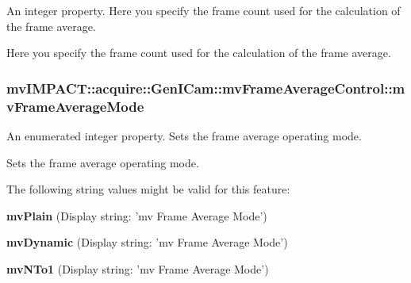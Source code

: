 An integer property. Here you specify the frame count used for the calculation of the frame average. 

Here you specify the frame count used for the calculation of the frame average. \hypertarget{classmv_i_m_p_a_c_t_1_1acquire_1_1_gen_i_cam_1_1mv_frame_average_control_acb77674635dac0f573c9b900d449dd8c}{
\subsubsection[{mv\+Frame\+Average\+Mode}]{ mv\+I\+M\+P\+A\+C\+T\+::acquire\+::\+Gen\+I\+Cam\+::mv\+Frame\+Average\+Control\+::mv\+Frame\+Average\+Mode}}\label{classmv_i_m_p_a_c_t_1_1acquire_1_1_gen_i_cam_1_1mv_frame_average_control_acb77674635dac0f573c9b900d449dd8c}


An enumerated integer property. Sets the frame average operating mode. 

Sets the frame average operating mode.

The following string values might be valid for this feature\+:
\begin{DoxyItemize}
\item {\bfseries mv\+Plain} (Display string\+: 'mv Frame Average Mode')
\item {\bfseries mv\+Dynamic} (Display string\+: 'mv Frame Average Mode')
\item {\bfseries mv\+N\+To1} (Display string\+: 'mv Frame Average Mode')
\end{DoxyItemize}

